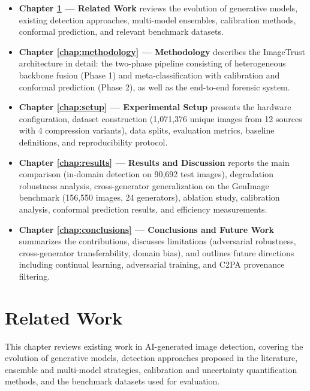 \documentclass[12pt,a4paper]{book}
\theoremstyle{definition}
\theoremstyle{remark}
\begin{document}
\begin{itemize}
    \item \textbf{Chapter \ref{chap:related} --- Related Work} reviews the evolution of generative models, existing detection approaches, multi-model ensembles, calibration methods, conformal prediction, and relevant benchmark datasets.

    \item \textbf{Chapter \ref{chap:methodology} --- Methodology} describes the ImageTrust architecture in detail: the two-phase pipeline consisting of heterogeneous backbone fusion (Phase 1) and meta-classification with calibration and conformal prediction (Phase 2), as well as the end-to-end forensic system.

    \item \textbf{Chapter \ref{chap:setup} --- Experimental Setup} presents the hardware configuration, dataset construction (1,071,376 unique images from 12 sources with 4 compression variants), data splits, evaluation metrics, baseline definitions, and reproducibility protocol.

    \item \textbf{Chapter \ref{chap:results} --- Results and Discussion} reports the main comparison (in-domain detection on 90,692 test images), degradation robustness analysis, cross-generator generalization on the GenImage benchmark (156,550 images, 24 generators), ablation study, calibration analysis, conformal prediction results, and efficiency measurements.

    \item \textbf{Chapter \ref{chap:conclusions} --- Conclusions and Future Work} summarizes the contributions, discusses limitations (adversarial robustness, cross-generator transferability, domain bias), and outlines future directions including continual learning, adversarial training, and C2PA provenance filtering.
\end{itemize}




\chapter{Related Work}\label{chap:related}

This chapter reviews existing work in AI-generated image detection, covering the evolution of generative models, detection approaches proposed in the literature, ensemble and multi-model strategies, calibration and uncertainty quantification methods, and the benchmark datasets used for evaluation.
\end{document}
